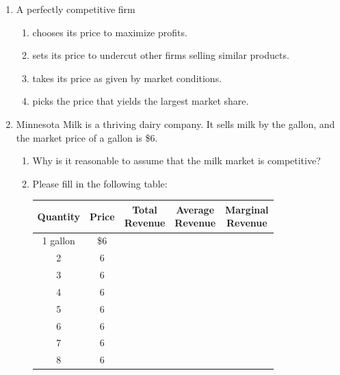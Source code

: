 \documentclass{article}
\begin{document}
\begin{enumerate}

	\item A perfectly competitive firm
	
		\begin{enumerate}
		
		\item chooses its price to maximize profits.
		
		\item sets its price to undercut other firms selling similar products.
		
		\item takes its price as given by market conditions.
		
		\item picks the price that yields the largest market share.
		
		\end{enumerate}
	
	\item Minnesota Milk is a thriving dairy company. It sells milk by the gallon, and the market price of a gallon is \$6.
	
		\begin{enumerate}
		
		\item Why is it reasonable to assume that the milk market is competitive?
	
		\item Please fill in the following table:
	
			\begin{center}
			\begin{tabular}{c | c | c | c | c }
			Quantity & Price & \makecell{Total\\Revenue} & \makecell{Average\\Revenue} & \makecell{Marginal\\Revenue} \\
			\hline
			1 gallon & \$6 & & & \\
			\hline
			2 & 6 & & & \\
			\hline
			3 & 6 & & & \\
			\hline
			4 & 6 & & & \\
			\hline
			5 & 6 & & & \\
			\hline
			6 & 6 & & & \\
			\hline
			7 & 6 & & & \\
			\hline
			8 & 6 & & &
			\end{tabular}
			\end{center}
			

\end{enumerate}
\end{enumerate}
\end{document}
